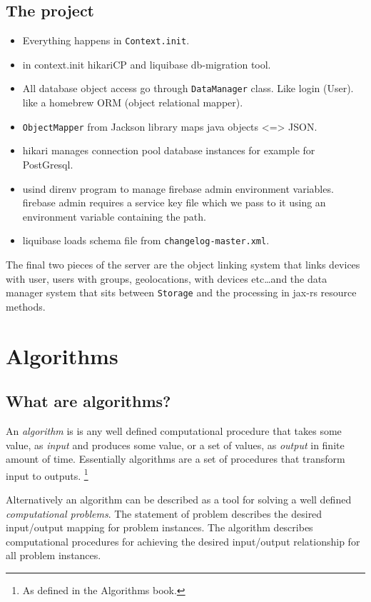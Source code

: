 \documentclass[a4paper]{article}
\begin{document}
\subsection*{The project}
\begin{itemize}
    \item Everything happens in \lstinline{Context.init}.
    \item in context.init hikariCP and liquibase db-migration tool.
    \item All database object access go through \lstinline{DataManager} class. Like login (User). like a homebrew ORM (object relational mapper).
    \item \lstinline{ObjectMapper} from Jackson library maps java objects <=> JSON.
    \item hikari manages connection pool database instances for example for PostGresql.
    \item usind direnv program to manage firebase admin environment variables. firebase admin requires a service
          key file which we pass to it using an environment variable containing the path.
    \item liquibase loads schema file from \lstinline{changelog-master.xml}.
\end{itemize}

The final two pieces of the server are the object linking system that links devices with user, users with groups, geolocations,
with devices etc\ldots and the data manager system that sits between \lstinline{Storage} and the processing in jax-rs 
resource methods.


\section*{Algorithms}

\subsection*{What are algorithms?}

An \emph{algorithm} is is any well defined computational procedure that takes some value, as \emph{input} and produces some value, 
or a set of values, as \emph{output} in finite amount of time. Essentially algorithms are a set of procedures that transform input to outputs.
\footnote{As defined in the Algorithms book.}

Alternatively an algorithm can be described as a tool for solving a well defined \emph{computational problems}. The statement of problem describes
the desired input/output mapping for problem instances. The algorithm describes computational procedures for achieving the desired input/output relationship
for all problem instances.
\end{document}
